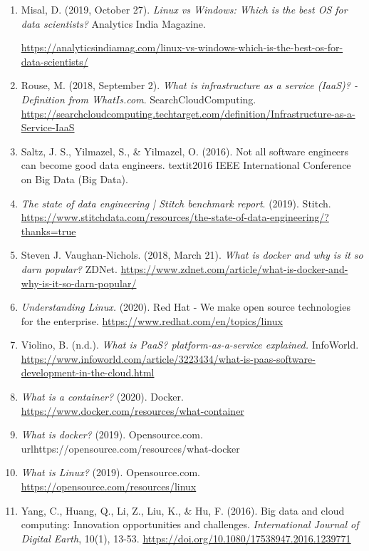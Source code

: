 \documentclass[]{article}
\begin{document}
\begin{enumerate}
	\item Misal, D. (2019, October 27). \textit{Linux vs Windows: Which is the best OS for data scientists?} Analytics India Magazine. 
	
	\url{https://analyticsindiamag.com/linux-vs-windows-which-is-the-best-os-for-data-scientists/}
	
	\item Rouse, M. (2018, September 2). \textit{What is infrastructure as a service (IaaS)? - Definition from WhatIs.com}. SearchCloudComputing. \url{https://searchcloudcomputing.techtarget.com/definition/Infrastructure-as-a-Service-IaaS}
	
	\item Saltz, J. S., Yilmazel, S., \& Yilmazel, O. (2016). Not all software engineers can become good data engineers. textit{2016 IEEE International Conference on Big Data (Big Data)}.
	
	\item \textit{The state of data engineering | Stitch benchmark report}. (2019). Stitch. \url{https://www.stitchdata.com/resources/the-state-of-data-engineering/?thanks=true}
	
	\item Steven J. Vaughan-Nichols. (2018, March 21). \textit{What is docker and why is it so darn popular?} ZDNet. \url{https://www.zdnet.com/article/what-is-docker-and-why-is-it-so-darn-popular/}
	
	\item \textit {Understanding Linux.} (2020). Red Hat - We make open source technologies for the enterprise. \url{https://www.redhat.com/en/topics/linux}
	
	\item Violino, B. (n.d.). \textit{What is PaaS? platform-as-a-service explained.} InfoWorld. \url{https://www.infoworld.com/article/3223434/what-is-paas-software-development-in-the-cloud.html}
	
	\item \textit{What is a container?} (2020). Docker. \url{https://www.docker.com/resources/what-container}
	
	\item \textit{What is docker?} (2019). Opensource.com. url{https://opensource.com/resources/what-docker}
	
	\item \textit{What is Linux?} (2019). Opensource.com. \url{https://opensource.com/resources/linux}
	
	\item Yang, C., Huang, Q., Li, Z., Liu, K., \& Hu, F. (2016). Big data and cloud computing: Innovation opportunities and challenges. \textit{International Journal of Digital Earth}, 10(1), 13-53. \url{https://doi.org/10.1080/17538947.2016.1239771}
\end{enumerate}
\end{document}
